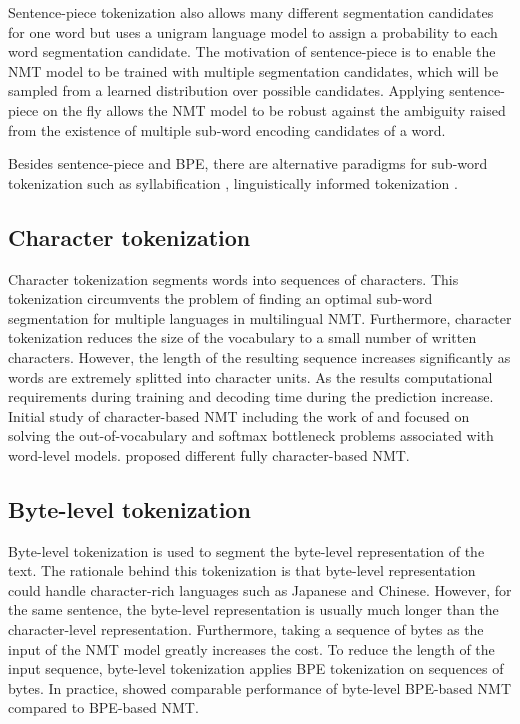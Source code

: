 Sentence-piece tokenization also allows many different segmentation candidates for one word but uses a unigram language model to assign a probability to each word segmentation candidate. The motivation of sentence-piece is to enable the NMT model to be trained with multiple segmentation candidates, which will be sampled from a learned distribution over possible candidates. Applying sentence-piece on the fly allows the NMT model to be robust against the ambiguity raised from the existence of multiple sub-word encoding candidates of a word. 

Besides sentence-piece and BPE, there are alternative paradigms for sub-word tokenization such as syllabification \citep{Assylbekov17syllable}, linguistically informed tokenization \citep{Ataman17linguistically, Huck17target, Machcek18morphological}.
\subsection{Character tokenization}
Character tokenization segments words into sequences of characters. This tokenization circumvents the problem of finding an optimal sub-word segmentation for multiple languages in multilingual NMT. Furthermore, character tokenization reduces the size of the vocabulary to a small number of written characters. However, the length of the resulting sequence increases significantly as words are extremely splitted into character units. As the results computational requirements during training and decoding time during the prediction increase. Initial study of character-based NMT including the work of \cite{Wang15character} and \cite{Luong16achieving} focused on solving the out-of-vocabulary and softmax bottleneck problems associated with word-level models. \cite{Costa16character, Lee17fully, Chung16character, costa17byte} proposed different fully character-based NMT.
\subsection{Byte-level tokenization}
Byte-level tokenization is used to segment the byte-level representation of the text. The rationale behind this tokenization is that byte-level representation could handle character-rich languages such as Japanese and Chinese. However, for the same sentence, the byte-level representation is usually much longer than the character-level representation. Furthermore, taking a sequence of bytes as the input of the NMT model greatly increases the cost. To reduce the length of the input sequence, byte-level tokenization applies BPE tokenization on sequences of bytes. In practice, \cite{Wang19neural} showed comparable performance of byte-level BPE-based NMT compared to BPE-based NMT. 
